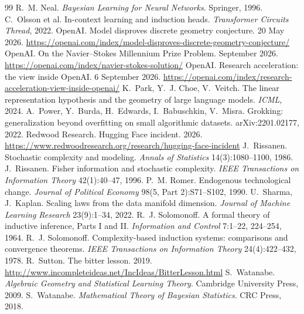 \begin{thebibliography}{99}
 R.~M. Neal. \emph{Bayesian Learning for Neural Networks}. Springer, 1996.
 C.~Olsson et al. In-context learning and induction heads. \emph{Transformer Circuits Thread}, 2022.
 OpenAI. Model disproves discrete geometry conjecture. 20 May 2026. \url{https://openai.com/index/model-disproves-discrete-geometry-conjecture/}
 OpenAI. On the Navier--Stokes Millennium Prize Problem. September 2026. \url{https://openai.com/index/navier-stokes-solution/}
 OpenAI. Research acceleration: the view inside OpenAI. 6 September 2026. \url{https://openai.com/index/research-acceleration-view-inside-openai/}
 K.~Park, Y.~J. Choe, V.~Veitch. The linear representation hypothesis and the geometry of large language models. \emph{ICML}, 2024.
 A.~Power, Y.~Burda, H.~Edwards, I.~Babuschkin, V.~Misra. Grokking: generalization beyond overfitting on small algorithmic datasets. arXiv:2201.02177, 2022.
 Redwood Research. Hugging Face incident. 2026. \url{https://www.redwoodresearch.org/research/hugging-face-incident}
 J.~Rissanen. Stochastic complexity and modeling. \emph{Annals of Statistics} 14(3):1080--1100, 1986.
 J.~Rissanen. Fisher information and stochastic complexity. \emph{IEEE Transactions on Information Theory} 42(1):40--47, 1996.
 P.~M. Romer. Endogenous technological change. \emph{Journal of Political Economy} 98(5, Part 2):S71--S102, 1990.
 U.~Sharma, J.~Kaplan. Scaling laws from the data manifold dimension. \emph{Journal of Machine Learning Research} 23(9):1--34, 2022.
 R.~J. Solomonoff. A formal theory of inductive inference, Parts I and II. \emph{Information and Control} 7:1--22, 224--254, 1964.
 R.~J. Solomonoff. Complexity-based induction systems: comparisons and convergence theorems. \emph{IEEE Transactions on Information Theory} 24(4):422--432, 1978.
 R.~Sutton. The bitter lesson. 2019. \url{http://www.incompleteideas.net/IncIdeas/BitterLesson.html}
 S.~Watanabe. \emph{Algebraic Geometry and Statistical Learning Theory}. Cambridge University Press, 2009.
 S.~Watanabe. \emph{Mathematical Theory of Bayesian Statistics}. CRC Press, 2018.

\end{thebibliography}
